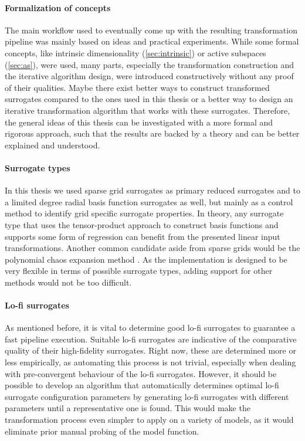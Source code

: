 \documentclass[
  a4paper,  %
  twoside,  %
  bibliography=totoc,
  headsepline,
  cleardoublepage=empty,
  parskip=half,
  draft=false
]{scrbook}
\begin{document}
\paragraph{Formalization of concepts}
The main workflow used to eventually come up with the resulting transformation pipeline was mainly based on ideas and practical experiments.
While some formal concepts, like intrinsic dimensionality (\cref{sec:intrinsic}) or active subspaces (\cref{sec:as}), were used, many parts, especially the transformation construction and the iterative algorithm design, were introduced constructively without any proof of their qualities.
Maybe there exist better ways to construct transformed surrogates compared to the ones used in this thesis or a better way to design an iterative transformation algorithm that works with these surrogates.
Therefore, the general ideas of this thesis can be investigated with a more formal and rigorous approach, such that the results are backed by a theory and can be better explained and understood.

\paragraph{Surrogate types}
In this thesis we used sparse grid surrogates as primary reduced surrogates and to a limited degree radial basis function surrogates as well, but mainly as a control method to identify grid specific surrogate properties.
In theory, any surrogate type that uses the tensor-product approach to construct basis functions and supports some form of regression can benefit from the presented linear input transformations.
Another common candidate aside from sparse grids would be the polynomial chaos expansion method \cite{Crestaux2009}.
As the implementation is designed to be very flexible in terms of possible surrogate types, adding support for other methods would not be too difficult.

\paragraph{Lo-fi surrogates}
As mentioned before, it is vital to determine good lo-fi surrogates to guarantee a fast pipeline execution.
Suitable lo-fi surrogates are indicative of the comparative quality of their high-fidelity surrogates.
Right now, these are determined more or less empirically, as automating this process is not trivial, especially when dealing with pre-convergent behaviour of the lo-fi surrogates.
However, it should be possible to develop an algorithm that automatically determines optimal lo-fi surrogate configuration parameters by generating lo-fi surrogates with different parameters until a representative one is found.
This would make the transformation process even simpler to apply on a variety of models, as it would eliminate prior manual probing of the model function.
\end{document}
